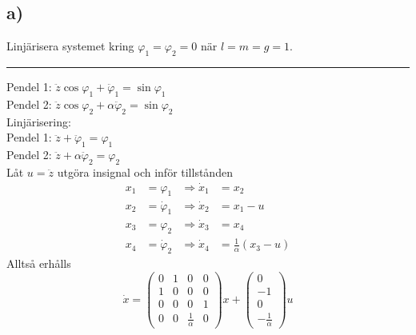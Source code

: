 \documentclass[12pt]{article}
\newcommand{\qline}{\hrule \vspace*{10pt}}
\begin{document}
\subsection*{a)}
Linjärisera systemet kring $\varphi_1 = \varphi_2 = 0$ när $l = m = g = 1$.
\qline
Pendel 1: $\ddot{z}\cos{\varphi_1} + \ddot{\varphi}_1 = \sin{\varphi_1}$ \\
Pendel 2: $\ddot{z}\cos{\varphi_2} + \alpha\ddot{\varphi}_2 = \sin{\varphi_2}$ \\
Linjärisering: \\
Pendel 1: $\ddot{z} + \ddot{\varphi}_1 = \varphi_1$ \\
Pendel 2: $\ddot{z} + \alpha\ddot{\varphi}_2 = \varphi_2$ \\
Låt $u = \ddot{z}$ utgöra insignal och inför tillstånden
\begin{align*}
x_1 &= \varphi_1 &\Rightarrow \dot{x}_1 &= x_2 \\
x_2 &= \dot{\varphi}_1 &\Rightarrow \dot{x}_2 &= x_1 - u\\
x_3 &= \varphi_2 &\Rightarrow \dot{x}_3 &= x_4\\
x_4 &= \dot{\varphi}_2 &\Rightarrow \dot{x}_4 &= \frac{1}{\alpha}(x_3 - u)
\end{align*}
Alltså erhålls
\[\dot{x} = \begin{pmatrix}
0 & 1 & 0 & 0 \\
1 & 0 & 0 & 0 \\
0 & 0 & 0 & 1 \\
0 & 0 & \frac{1}{\alpha} & 0
\end{pmatrix}x + \begin{pmatrix}
0 \\
-1 \\
0 \\
-\frac{1}{\alpha}
\end{pmatrix}u \]
\end{document}
